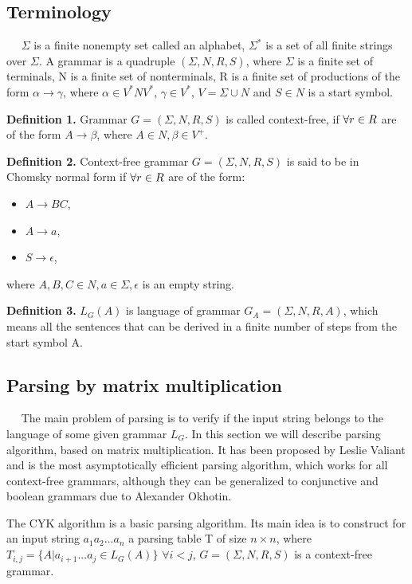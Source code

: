 \documentclass{article}
\begin{document}
 \subsection{Terminology}
 
  $\quad$ $\Sigma$ is a finite nonempty set called an alphabet, $\Sigma^{*}$ is a set of all finite strings over $\Sigma$. A grammar is a quadruple $(\Sigma, N, R, S)$, where $\Sigma$ is a finite set of terminals, N is a finite set of nonterminals, R is a finite set of productions of the form $\alpha \rightarrow \gamma$, where $\alpha \in V^{*}NV^{*}$, $\gamma \in V^{*}$, $V = \Sigma \cup N$ and $S \in N$ is a start symbol. 
 
 \textbf{Definition 1.} Grammar $G = (\Sigma, N, R, S)$ is called context-free, if $\space\forall r \in R$ are of the form $A \rightarrow \beta$, where $A \in N, \beta \in V^{+}$. 
 
 \textbf{Definition 2.} Context-free grammar $G = (\Sigma, N, R, S)$ is said to be in Chomsky normal form if $\space\forall r \in R$ are of the form: 
 \begin{itemize}
   \item $A \rightarrow BC$,
   \item $A \rightarrow a$,
   \item $S \rightarrow \epsilon$, 
 \end{itemize}
 where $A, B, C \in N, a \in \Sigma, \epsilon$ is an empty string. 
 
 \textbf{Definition 3.} $L_{G}(A)$ is language of grammar $G_{A} = (\Sigma, N, R, A)$, which means all the sentences that can be derived in a finite number of steps from the start symbol A.
 
  \subsection{Parsing by matrix multiplication}
  
  $\quad$  The main problem of parsing is to verify if the input string belongs to the language of some given grammar $L_{G}$. In this section we will describe parsing algorithm, based on matrix multiplication. It has been proposed by Leslie Valiant and is the most asymptotically efficient parsing algorithm, which works for all context-free grammars, although they can be generalized to conjunctive and boolean grammars due to Alexander Okhotin. 
  
  The CYK algorithm is a basic parsing algorithm. Its main idea is to construct for an input string $a_{1}a_{2}...a_{n}$ a parsing table T of size $n \times n$,  where $T_{i, j} =  \{ A |  a_{i + 1}...a_{j} \in L_{G}(A)\}$ $\forall i < j$, $G = (\Sigma, N, R, S)$ is a context-free grammar. 
  
\end{document}

